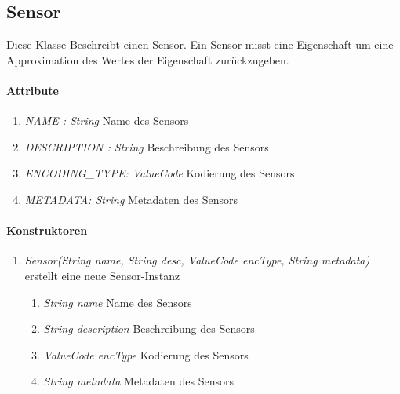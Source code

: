 \subsection{Sensor}
Diese Klasse Beschreibt einen Sensor. Ein Sensor misst eine Eigenschaft um eine Approximation des Wertes der Eigenschaft zurückzugeben.
\paragraph{Attribute}
\begin{enumerate}[$\bullet$]
	\item \textit{NAME : String} Name des Sensors
	\item \textit{DESCRIPTION : String} Beschreibung des Sensors
	\item \textit{ENCODING\_TYPE: ValueCode} Kodierung des Sensors
	\item \textit{METADATA: String} Metadaten des Sensors
\end{enumerate}

\paragraph{Konstruktoren}
\begin{enumerate}[+]
	\item \textit{ Sensor(String name, String desc, ValueCode encType, String metadata)}
	erstellt eine neue Sensor-Instanz
	\begin{enumerate}[$\bullet$]
		\item \textit{String name} Name des Sensors
		\item \textit{String description} Beschreibung des Sensors
		\item \textit{ValueCode encType} Kodierung des Sensors
		\item \textit{String metadata} Metadaten des Sensors
	\end{enumerate}
	
\end{enumerate}
